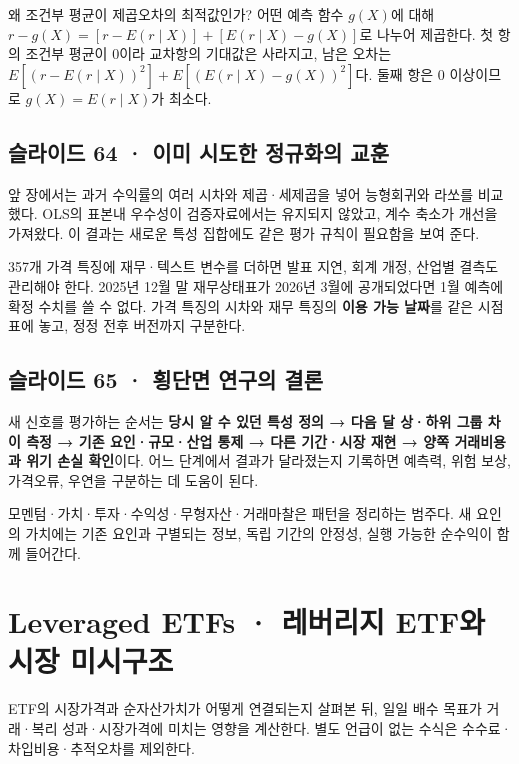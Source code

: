\documentclass[11pt,a4paper]{article}
\begin{document}
왜 조건부 평균이 제곱오차의 최적값인가? 어떤 예측 함수 $g(X)$에 대해 $r-g(X)=[r-E(r\mid X)]+[E(r\mid X)-g(X)]$로 나누어 제곱한다. 첫 항의 조건부 평균이 0이라 교차항의 기대값은 사라지고, 남은 오차는 $E[(r-E(r\mid X))^2]+E[(E(r\mid X)-g(X))^2]$다. 둘째 항은 0 이상이므로 $g(X)=E(r\mid X)$가 최소다.\par

\subsection{슬라이드 64 · 이미 시도한 정규화의 교훈}
앞 장에서는 과거 수익률의 여러 시차와 제곱·세제곱을 넣어 능형회귀와 라쏘를 비교했다. OLS의 표본내 우수성이 검증자료에서는 유지되지 않았고, 계수 축소가 개선을 가져왔다. 이 결과는 새로운 특성 집합에도 같은 평가 규칙이 필요함을 보여 준다.\par

357개 가격 특징에 재무·텍스트 변수를 더하면 발표 지연, 회계 개정, 산업별 결측도 관리해야 한다. 2025년 12월 말 재무상태표가 2026년 3월에 공개되었다면 1월 예측에 확정 수치를 쓸 수 없다. 가격 특징의 시차와 재무 특징의 \textbf{이용 가능 날짜}를 같은 시점표에 놓고, 정정 전후 버전까지 구분한다.\par

\subsection{슬라이드 65 · 횡단면 연구의 결론}
새 신호를 평가하는 순서는 \textbf{당시 알 수 있던 특성 정의 → 다음 달 상·하위 그룹 차이 측정 → 기존 요인·규모·산업 통제 → 다른 기간·시장 재현 → 양쪽 거래비용과 위기 손실 확인}이다. 어느 단계에서 결과가 달라졌는지 기록하면 예측력, 위험 보상, 가격오류, 우연을 구분하는 데 도움이 된다.\par

모멘텀·가치·투자·수익성·무형자산·거래마찰은 패턴을 정리하는 범주다. 새 요인의 가치에는 기존 요인과 구별되는 정보, 독립 기간의 안정성, 실행 가능한 순수익이 함께 들어간다.\par

\section{Leveraged ETFs · 레버리지 ETF와 시장 미시구조}
ETF의 시장가격과 순자산가치가 어떻게 연결되는지 살펴본 뒤, 일일 배수 목표가 거래·복리 성과·시장가격에 미치는 영향을 계산한다. 별도 언급이 없는 수식은 수수료·차입비용·추적오차를 제외한다.\par
\end{document}

